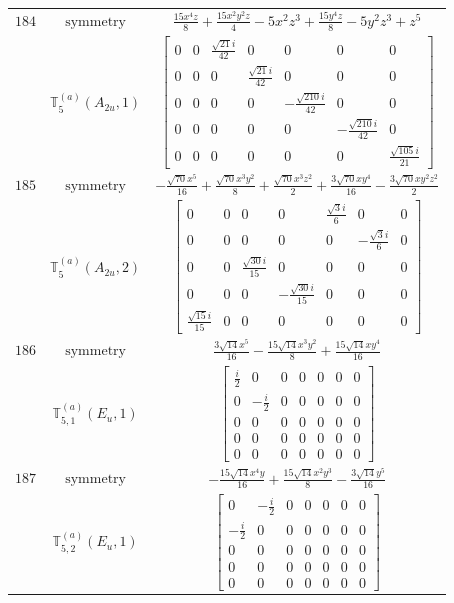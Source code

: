 \documentclass[fleqn,8pt,landscape]{jsarticle}
\begin{document}
\begin{longtable}{ccc}
$ 184 $ & $ \text{symmetry} $ & $ \frac{15 x^{4} z}{8} + \frac{15 x^{2} y^{2} z}{4} - 5 x^{2} z^{3} + \frac{15 y^{4} z}{8} - 5 y^{2} z^{3} + z^{5} $ \\
$  $ & $ \mathbb{T}_{5}^{(a)}(A_{2u},1) $ & $ \begin{bmatrix} 0 & 0 & \frac{\sqrt{21} i}{42} & 0 & 0 & 0 & 0 \\ 0 & 0 & 0 & \frac{\sqrt{21} i}{42} & 0 & 0 & 0 \\ 0 & 0 & 0 & 0 & - \frac{\sqrt{210} i}{42} & 0 & 0 \\ 0 & 0 & 0 & 0 & 0 & - \frac{\sqrt{210} i}{42} & 0 \\ 0 & 0 & 0 & 0 & 0 & 0 & \frac{\sqrt{105} i}{21} \end{bmatrix} $ \\ \hline
$ 185 $ & $ \text{symmetry} $ & $ - \frac{\sqrt{70} x^{5}}{16} + \frac{\sqrt{70} x^{3} y^{2}}{8} + \frac{\sqrt{70} x^{3} z^{2}}{2} + \frac{3 \sqrt{70} x y^{4}}{16} - \frac{3 \sqrt{70} x y^{2} z^{2}}{2} $ \\
$  $ & $ \mathbb{T}_{5}^{(a)}(A_{2u},2) $ & $ \begin{bmatrix} 0 & 0 & 0 & 0 & \frac{\sqrt{3} i}{6} & 0 & 0 \\ 0 & 0 & 0 & 0 & 0 & - \frac{\sqrt{3} i}{6} & 0 \\ 0 & 0 & \frac{\sqrt{30} i}{15} & 0 & 0 & 0 & 0 \\ 0 & 0 & 0 & - \frac{\sqrt{30} i}{15} & 0 & 0 & 0 \\ \frac{\sqrt{15} i}{15} & 0 & 0 & 0 & 0 & 0 & 0 \end{bmatrix} $ \\ \hline
$ 186 $ & $ \text{symmetry} $ & $ \frac{3 \sqrt{14} x^{5}}{16} - \frac{15 \sqrt{14} x^{3} y^{2}}{8} + \frac{15 \sqrt{14} x y^{4}}{16} $ \\
$  $ & $ \mathbb{T}_{5,1}^{(a)}(E_{u},1) $ & $ \begin{bmatrix} \frac{i}{2} & 0 & 0 & 0 & 0 & 0 & 0 \\ 0 & - \frac{i}{2} & 0 & 0 & 0 & 0 & 0 \\ 0 & 0 & 0 & 0 & 0 & 0 & 0 \\ 0 & 0 & 0 & 0 & 0 & 0 & 0 \\ 0 & 0 & 0 & 0 & 0 & 0 & 0 \end{bmatrix} $ \\ \hline
$ 187 $ & $ \text{symmetry} $ & $ - \frac{15 \sqrt{14} x^{4} y}{16} + \frac{15 \sqrt{14} x^{2} y^{3}}{8} - \frac{3 \sqrt{14} y^{5}}{16} $ \\
$  $ & $ \mathbb{T}_{5,2}^{(a)}(E_{u},1) $ & $ \begin{bmatrix} 0 & - \frac{i}{2} & 0 & 0 & 0 & 0 & 0 \\ - \frac{i}{2} & 0 & 0 & 0 & 0 & 0 & 0 \\ 0 & 0 & 0 & 0 & 0 & 0 & 0 \\ 0 & 0 & 0 & 0 & 0 & 0 & 0 \\ 0 & 0 & 0 & 0 & 0 & 0 & 0 \end{bmatrix} $ \\ \hline

\end{longtable}
\end{document}
